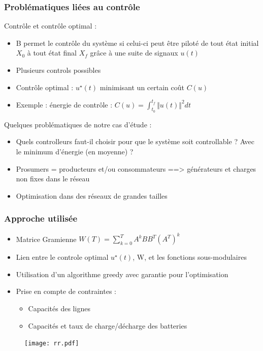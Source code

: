 \documentclass[xcolor=dvipsnames]{beamer}
\begin{document}
\begin{frame}
\begin{columns}
\begin{column}{.5\textwidth}
\begin{figure}
 			\end{figure}
		\end{column}
	\end{columns}
\end{frame}


\begin{frame}
	\frametitle{Problématiques liées au contrôle}
	
	Contrôle et contrôle optimal :
	\begin{itemize}
		\item B permet le contrôle du système si celui-ci peut être piloté de tout état initial $X_0$ à tout état final $X_f$ grâce à une suite de signaux $u(t)$
		\item Plusieurs controls possibles
		\item Contrôle optimal : $u^{\star}(t)$ minimisant un certain coût $ C(u) $
		\item Exemple : énergie de contrôle : $ C(u) = \int_{t_0}^{t_f} \Vert u(t) \Vert^{2} dt $
	\end{itemize}
	Quelques problématiques de notre cas d'étude :
	\begin{itemize}
		\item Quels controlleurs faut-il choisir pour que le système soit controllable ? Avec le minimum d'énergie (en moyenne) ?
		\item Prosumers = producteurs et/ou consommateurs ==> générateurs et charges non fixes dans le réseau
		\item Optimisation dans des réseaux de grandes tailles
	\end{itemize}
\end{frame}

\begin{frame}
	\frametitle{Approche utilisée}
	
	\begin{itemize}
		\item Matrice Gramienne $ W(T) = \sum_{k=0}^{T} A^kBB^T(A^T)^k $
		\item Lien entre le controle optimal $u^{\star}(t)$, W, et les fonctions sous-modulaires
		\item Utilisation d'un algorithme greedy avec garantie pour l'optimisation 
		\item Prise en compte de contraintes :
		\begin{itemize}
			\item Capacités des lignes
			\item Capacités et taux de charge/décharge des batteries
		\end{itemize}
	\end{itemize}
	
	\begin{figure}
		\texttt{[image: rr.pdf]}
	\end{figure}
\end{frame}
\end{document}
